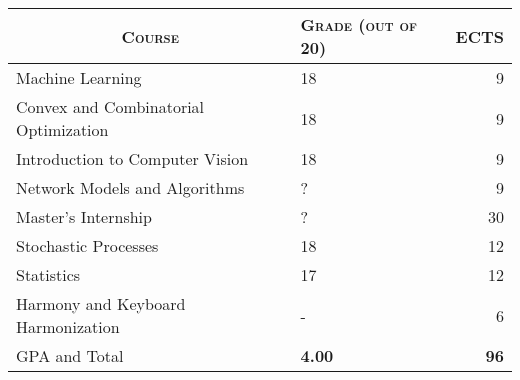 \documentclass[a4paper,10pt]{article} %
\begin{document}
\begin{center}
\begin{tabular}{llr}
  \multicolumn{1}{c}{\textsc{Course}} & \textsc{Grade (out of 20)}&\textsc{ECTS}\\ \hline
  Machine Learning & 18 & 9 \\
  Convex and Combinatorial Optimization & 18 & 9 \\
  Introduction to Computer Vision & 18 & 9 \\
  Network Models and Algorithms & ?\footnotemark[1] & 9 \\
  Master's Internship & ?\footnotemark[1] & 30 \\
  \hline
  Stochastic Processes & 18 & 12 \\
  Statistics & 17 & 12 \\
  \hline
  Harmony and Keyboard Harmonization & -\footnotemark[2] & 6 \\
  \hline
  \textsc{GPA} and Total & \textbf{4.00} & \textbf{96}
\end{tabular}
\end{center}

\vspace{1em}

 \\

\end{document}
